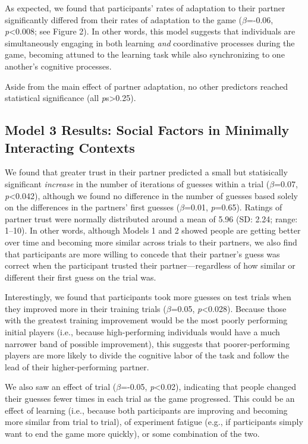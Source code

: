 \documentclass[10pt, letterpaper]{article}
\begin{document}
As expected, we found that participants' rates of adaptation to their
partner significantly differed from their rates of adaptation to the
game (\emph{\(\beta\)}=-0.06, \emph{p}\textless{}0.008; see Figure 2).
In other words, this model suggests that individuals are simultaneously
engaging in both learning \emph{and} coordinative processes during the
game, becoming attuned to the learning task while also synchronizing to
one another's cognitive processes.

Aside from the main effect of partner adaptation, no other predictors
reached statistical significance (all \emph{p}s\textgreater{}0.25).

\subsection{Model 3 Results: Social Factors in Minimally Interacting
Contexts}\label{model-3-results-social-factors-in-minimally-interacting-contexts}

We found that greater trust in their partner predicted a small but
statisically significant \emph{increase} in the number of iterations of
guesses within a trial (\emph{\(\beta\)}=0.07,
\emph{p}\textless{}0.042), although we found no difference in the number
of guesses based solely on the differences in the partners' first
guesses (\emph{\(\beta\)}=0.01, \emph{p}=0.65). Ratings of partner trust
were normally distributed around a mean of 5.96 (SD: 2.24; range:
1--10). In other words, although Models 1 and 2 showed people are
getting better over time and becoming more similar across trials to
their partners, we also find that participants are more willing to
concede that their partner's guess was correct when the participant
trusted their partner---regardless of how similar or different their
first guess on the trial was.

Interestingly, we found that participants took more guesses on test
trials when they improved more in their training trials
(\emph{\(\beta\)}=0.05, \emph{p}\textless{}0.028). Because those with
the greatest training improvement would be the most poorly performing
initial players (i.e., because high-performing individuals would have a
much narrower band of possible improvement), this suggests that
poorer-performing players are more likely to divide the cognitive labor
of the task and follow the lead of their higher-performing partner.

We also saw an effect of trial (\emph{\(\beta\)}=-0.05,
\emph{p}\textless{}0.02), indicating that people changed their guesses
fewer times in each trial as the game progressed. This could be an
effect of learning (i.e., because both participants are improving and
becoming more similar from trial to trial), of experiment fatigue (e.g.,
if participants simply want to end the game more quickly), or some
combination of the two.
\end{document}
